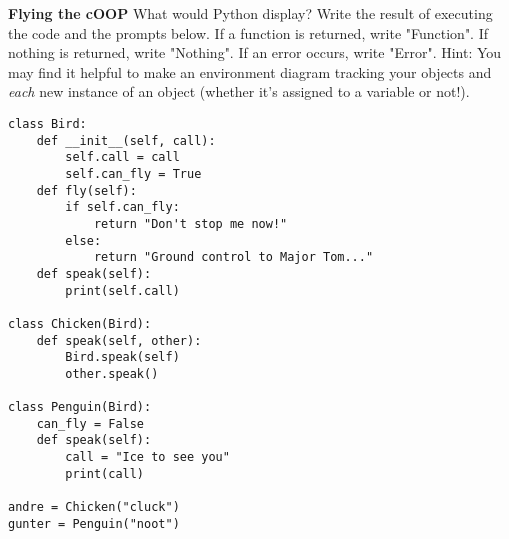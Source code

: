 \twocolumn
\begin{blocksection}

\question \textbf{Flying the cOOP} What would Python display? Write the result of executing the code and the prompts below. If a function is returned, write "Function". If nothing is returned, write "Nothing". If an error occurs, write "Error".
\newline Hint: You may find it helpful to make an environment diagram tracking your objects and \textit{each} new instance of an object (whether it's assigned to a variable or not!).

\vspace{2\baselineskip}

\begin{lstlisting}
class Bird:
    def __init__(self, call):
        self.call = call
        self.can_fly = True
    def fly(self):
        if self.can_fly:
            return "Don't stop me now!"
        else:
            return "Ground control to Major Tom..."
    def speak(self):
        print(self.call)

class Chicken(Bird):
    def speak(self, other):
        Bird.speak(self)
        other.speak()

class Penguin(Bird):
    can_fly = False
    def speak(self):
        call = "Ice to see you"
        print(call)

andre = Chicken("cluck")
gunter = Penguin("noot")
\end{lstlisting}
\end{blocksection}

